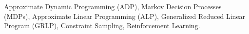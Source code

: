 \begin{comment}
\begin{abstract}
The approximate linear programming (ALP) method and its variants have been widely applied to various Markov Decision Processes (MDPs) with large number of states. A serious limitation of the ALP is that it has intractable number of constraints. A practical solution is to sample a tractable number constraints of the ALP to formulate a reduced linear program (ALP). In this paper, we generalize the RLP to define a generalized reduced linear program (GRLP) which has a tractable number of constraints that are obtained as positive linear combinations of the original constraints of the ALP. The main contribution of this paper is the novel theoretical framework developed to obtain error bounds for any given GRLP. Unlike prior results on constraint sampling which hold only with high probability, our analysis holds with probability one and is based on a novel contraction operator. 
\end{abstract}
\end{comment}
\begin{keywords}{
Approximate Dynamic Programming (ADP), Markov Decision Processes (MDPs), Approximate Linear Programming (ALP), Generalized Reduced Linear Program (GRLP), Constraint Sampling, Reinforcement Learning.}
\end{keywords}
